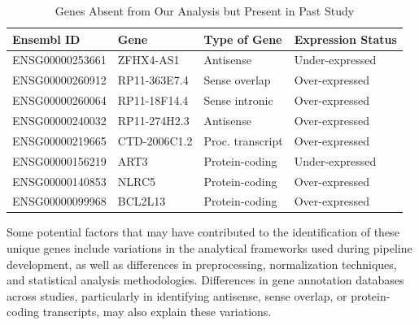 \begin{table}[H]
    \centering
    \begin{tabular}{llll}
        \toprule
        Ensembl ID          & Gene               & Type of Gene            & Expression Status         \\ 
        \midrule
        ENSG00000253661     & ZFHX4-AS1          & Antisense               & Under-expressed           \\ 
        ENSG00000260912     & RP11-363E7.4       & Sense overlap           & Over-expressed            \\ 
        ENSG00000260064     & RP11-18F14.4       & Sense intronic          & Over-expressed            \\ 
        ENSG00000240032     & RP11-274H2.3       & Antisense               & Over-expressed            \\ 
        ENSG00000219665     & CTD-2006C1.2       & Proc. transcript        & Over-expressed            \\ 
        ENSG00000156219     & ART3               & Protein-coding          & Under-expressed           \\ 
        ENSG00000140853     & NLRC5              & Protein-coding          & Over-expressed            \\ 
        ENSG00000099968     & BCL2L13            & Protein-coding          & Over-expressed            \\ 
        \bottomrule
    \end{tabular}
    \caption{Genes Absent from Our Analysis but Present in Past Study}
    \label{tab:absent_genes}
\end{table}

Some potential factors that may have contributed to the identification of these unique genes include variations in the analytical frameworks used during pipeline development, as well as differences in preprocessing, normalization techniques, and statistical analysis methodologies. Differences in gene annotation databases across studies, particularly in identifying antisense, sense overlap, or protein-coding transcripts, may also explain these variations.


